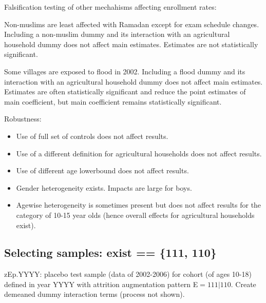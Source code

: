 Falsification testing of other mechahisms affecting enrollment rates:
\begin{description}
\vspace{1.0ex}\setlength{\itemsep}{1.0ex}\setlength{\baselineskip}{12pt}
\item[Non-muslims]	Non-muslims are least affected with Ramadan except for exam schedule changes. Including a non-muslim dummy and its interaction with an agricultural household dummy does not affect main estimates. Estimates are not statistically significant.
\item[Flood]	Some villages are exposed to flood in 2002. Including a flood dummy and its interaction with an agricultural household dummy does not affect main estimates. Estimates are often statistically significant and reduce the point estimates of main coefficient, but main coefficient remains statistically significant.
\end{description}
Robustness:
\begin{itemize}
\vspace{1.0ex}\setlength{\itemsep}{1.0ex}\setlength{\baselineskip}{12pt}
\item	Use of full set of controls does not affect results.
\item	Use of a different definition for agricultural households does not affect results.
\item	Use of different age lowerbound does not affect results.
\item	Gender heterogeneity exists. Impacts are large for boys.
\item	Agewise heterogeneity is sometimes present but does not affect results for the category of 10-15 year olds (hence overall effects for agricultural households exist).
\end{itemize}


\subsection{Selecting samples: \textsf{exist == \{111, 110\}}}

\textsf{zEp.YYYY}: \textsf{p}lacebo test sample (data of 2002-2006) for cohort (of ages 10-18) defined in year \textsf{YYYY} with attrition augmentation pattern \textsf{E$=111|110$}. Create demeaned dummy interaction terms (process not shown).

